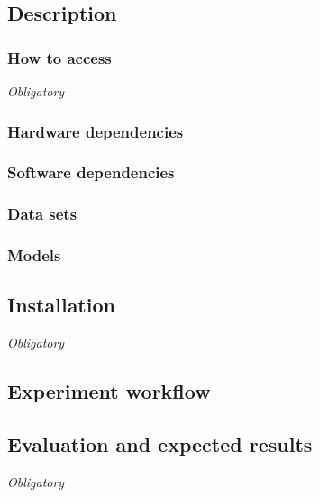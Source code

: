 \documentclass{sigplanconf}
\begin{document}
\subsection{Description}

\subsubsection{How to access}

{\em Obligatory}

\subsubsection{Hardware dependencies}

\subsubsection{Software dependencies}

\subsubsection{Data sets}

\subsubsection{Models}

\subsection{Installation}

{\em Obligatory}

\subsection{Experiment workflow}

\subsection{Evaluation and expected results}

{\em Obligatory}

\end{document}
